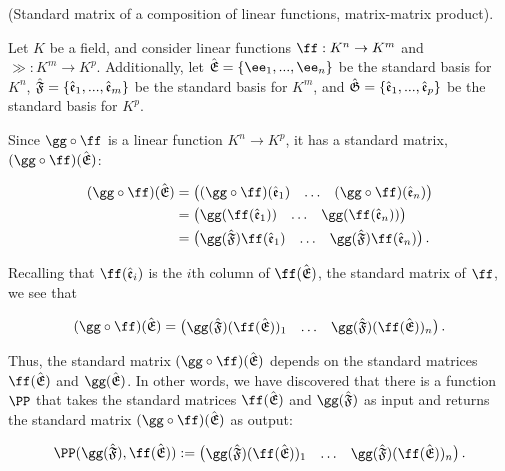 \begin{defn}
\label{ch::lin_alg::thm::matrix_matrix_product_relative_to_bases_standard}
    (Standard matrix of a composition of linear functions, matrix-matrix product). 
    
    Let $K$ be a field, and consider linear functions $\ff:K^n \rightarrow K^m$ and $\gg:K^m \rightarrow K^p$. Additionally, let $\sE = \{\ee_1, ..., \ee_n\}$ be the standard basis for $K^n$, ${\hat{\mathfrak{F}}} = \{\hat{\mathfrak{e}}_1, ..., \hat{\mathfrak{e}}_m\}$ be the standard basis for $K^m$, and ${\hat{\mathfrak{G}}} = \{\hat{\mathfrak{e}}_1, ..., \hat{\mathfrak{e}}_p\}$ be the standard basis for $K^p$.
    
    Since $\gg \circ \ff$ is a linear function $K^n \rightarrow K^p$, it has a standard matrix, $(\gg \circ \ff)(\sE)$:
    
    \begin{align*}
        (\gg \circ \ff)(\sE)
        &=
        \begin{pmatrix}
            (\gg \circ \ff)(\see_1) & \hdots & (\gg \circ \ff)(\see_n)
        \end{pmatrix} \\
        &=
        \begin{pmatrix}
            \gg(\ff(\see_1)) & \hdots & \gg(\ff(\see_n))
        \end{pmatrix} \\
        &=
        \begin{pmatrix}
            \gg(\sF) \ff(\see_1) & \hdots & \gg(\sF) \ff(\see_n)
        \end{pmatrix}.
    \end{align*}
    
    Recalling that $\ff(\see_i)$ is the $i$th column of $\ff(\sE)$, the standard matrix of $\ff$, we see that
    
    \begin{align*}
        (\gg \circ \ff)(\sE) = 
        \begin{pmatrix} 
            \gg(\sF) (\ff(\sE))_1 & \hdots & \gg(\sF) (\ff(\sE))_n
        \end{pmatrix}.
    \end{align*}
    
    Thus, the standard matrix $(\gg \circ \ff)(\sE)$ depends on the standard matrices $\ff(\sE)$ and $\gg(\sE)$. In other words, we have discovered that there is a function $\PP$ that takes the standard matrices $\ff(\sE)$ and $\gg(\sF)$ as input and returns the standard matrix $(\gg \circ \ff)(\sE)$ as output:
    
    \begin{align*}
        \PP(\gg(\sF), \ff(\sE)) := \begin{pmatrix} 
            \gg(\sF) (\ff(\sE))_1 & \hdots & \gg(\sF) (\ff(\sE))_n
        \end{pmatrix}.
    \end{align*}
    

\end{defn}
